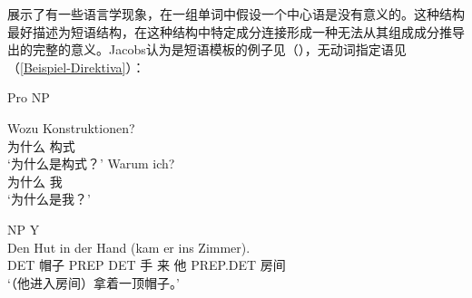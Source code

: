\begin{exe}
\begin{xlist}[iv.]
\begin{exe}
\begin{xlist}[iv.]
\citet{Jacobs2008a}展示了有一些语言学现象，在一组单词中假设一个中心语是没有意义的。这种结构最好描述为短语结构，在这种结构中特定成分连接形成一种无法从其组成成分推导出的完整的意义。Jacobs认为是短语模板的例子见（），无动词指定语见（\ref{Beispiel-Direktiva}）：
\begin{exe}
\ex Pro NP
\begin{xlist}
\ex
\gll  Wozu Konstruktionen?\\
      为什么 构式\\
\glt `为什么是构式？'
\ex 
\gll Warum ich?\\
     为什么 我\\
\glt `为什么是我？'
\end{xlist}
\end{exe}
\ea
NP Y\\
\gll Den Hut in der Hand (kam er ins Zimmer).\\
     DET 帽子 PREP DET 手 来 他 PREP.DET 房间\\
\glt `（他进入房间）拿着一顶帽子。'


\end{xlist}
\end{exe}
\end{xlist}
\end{exe}

